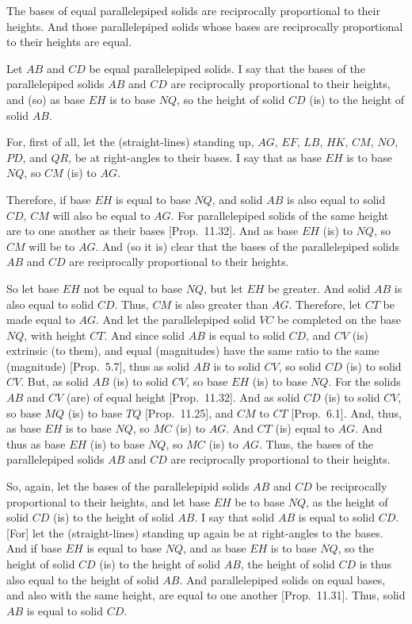 \begin{Parallel}{}{}
{The  bases of equal parallelepiped solids are reciprocally proportional to their heights. And those parallelepiped solids
whose bases are reciprocally proportional to their heights are equal.

Let $AB$ and $CD$ be equal parallelepiped solids. I say that the
bases of the parallelepiped solids $AB$ and $CD$ are reciprocally
proportional to their heights, and (so) as base $EH$ is to base $NQ$, so the
height of solid $CD$ (is) to the height of solid $AB$.

For, first of all, let the (straight-lines) standing up, $AG$, $EF$, $LB$, $HK$, $CM$,
$NO$, $PD$, and $QR$,  be at right-angles to their bases. I say that
as base $EH$ is to base $NQ$, so $CM$ (is) to $AG$.

Therefore, if base $EH$ is equal to base $NQ$, and solid $AB$ is also
equal to solid $CD$, $CM$ will also be equal to $AG$. For
parallelepiped solids of the same height are to one another as their bases [Prop.~11.32]. And as base $EH$ (is) to $NQ$,
so $CM$ will be to $AG$. And (so it is) clear that the bases of the parallelepiped
solids $AB$ and $CD$ are reciprocally proportional to their heights.

\epsfysize=1.9in
\centerline{}

So let base $EH$ not be equal to base $NQ$, but let $EH$ be greater. And
solid $AB$ is also equal to solid $CD$. Thus, $CM$ is also greater than $AG$.  Therefore, let $CT$ be made equal to $AG$. And let the parallelepiped
solid $VC$ be completed on the base $NQ$, with height $CT$.
And since solid $AB$ is equal to solid $CD$, and $CV$ (is)
extrinsic (to them), and equal (magnitudes) have the same ratio to the
same (magnitude) [Prop.~5.7], thus as solid
$AB$ is to solid $CV$, so solid $CD$ (is) to solid $CV$. But, as
solid $AB$ (is) to solid $CV$, so base $EH$ (is) to base $NQ$. For the solids $AB$ and $CV$ (are) of equal
height [Prop.~11.32]. And as solid $CD$ (is) to solid $CV$, so base $MQ$ (is) to 
base $TQ$ [Prop.~11.25], and $CM$ to $CT$
[Prop.~6.1].
And, thus, as base $EH$ is to base $NQ$, so $MC$ (is) to $AG$.
And $CT$ (is) equal to $AG$. And
thus as base $EH$ (is) to base $NQ$, so $MC$ (is) to $AG$. Thus, the
bases of the parallelepiped solids $AB$ and $CD$ are reciprocally proportional to their
heights.

So, again, let the bases of the parallelepipid solids $AB$ and $CD$
be reciprocally proportional to their heights, and let base $EH$
be to base $NQ$, as the height of solid $CD$ (is) to the
height of solid $AB$. I say that solid $AB$ is equal to solid $CD$.
\mbox{[}For] let the (straight-lines) standing up again be at right-angles to the
bases. And if base $EH$ is equal to base $NQ$, and as base $EH$
is to base $NQ$, so the height of solid $CD$ (is) to the
height of solid $AB$, the height of solid $CD$ is thus also
equal to the height of solid $AB$. And parallelepiped solids on equal
bases, and also with the same height,  are equal to one another [Prop.~11.31]. Thus, solid $AB$ is equal to solid $CD$.

}
\end{Parallel}
